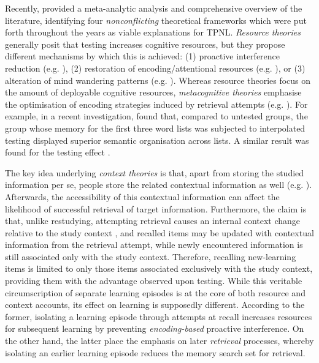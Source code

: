 \documentclass[../main.tex]{subfiles}
\begin{document}
Recently, \cite{chanRetrievalPotentiatesNew2018} provided a meta-analytic analysis and comprehensive overview of the literature, identifying four \textit{nonconflicting} theoretical frameworks which were put forth throughout the years as viable explanations for TPNL. \textit{Resource theories} generally posit that testing increases cognitive resources, but they propose different mechanisms by which this is achieved: (1) proactive interference reduction (e.g. \citealp{wahlheimTestingCanCounteract2015, weinsteinTestingProtectsProactive2011, szpunarTestingStudyInsulates2008, nunesTestingImprovesTrue2012}), (2) restoration of encoding/attentional resources (e.g. \citealp{pastotterRetrievalLearningFacilitates2011}), or (3) alteration of mind wandering patterns (e.g. \citealp{jingInterpolatedTestingInfluences2016,szpunarInterpolatedMemoryTests2013,szpunarMindWanderingEducation2013}). Whereas resource theories focus on the amount of deployable cognitive resources, \textit{metacognitive theories} emphasise the optimisation of encoding strategies induced by retrieval attempts (e.g. \citealp{choTestingEnhancesBoth2017, chanTestingPotentiatesNew2018}). For example, in a recent investigation, \cite{chanTestingPotentiatesNew2018} found that, compared to untested groups, the group whose memory for the first three word lists was subjected to interpolated testing displayed superior semantic organisation across lists. A similar result was found for the testing effect \citep{zarombTestingEffectFree2010}.

The key idea underlying \textit{context theories} is that, apart from storing the studied information per se, people store the related contextual information as well (e.g. \citealp{lehmanEpisodicContextAccount2014}). Afterwards, the accessibility of this contextual information can affect the likelihood of successful retrieval of target information. Furthermore, the claim is that, unlike restudying, attempting retrieval causes an internal context change relative to the study context \citep{jangContextRetrievalContext2008, sahakyanContextualChangeAccount2002}, and recalled items may be updated with contextual information from the retrieval attempt, while newly encountered information is still associated only with the study context. Therefore, recalling new-learning items is limited to only those items associated exclusively with the study context, providing them with the advantage observed upon testing. While this veritable circumscription of separate learning episodes is at the core of both resource and context accounts, its effect on learning is supposedly different. According to the former, isolating a learning episode through attempts at recall increases resources for subsequent learning by preventing \textit{encoding-based} proactive interference. On the other hand, the latter place the emphasis on later \textit{retrieval} processes, whereby isolating an earlier learning episode reduces the memory search set for retrieval. 
\end{document}
